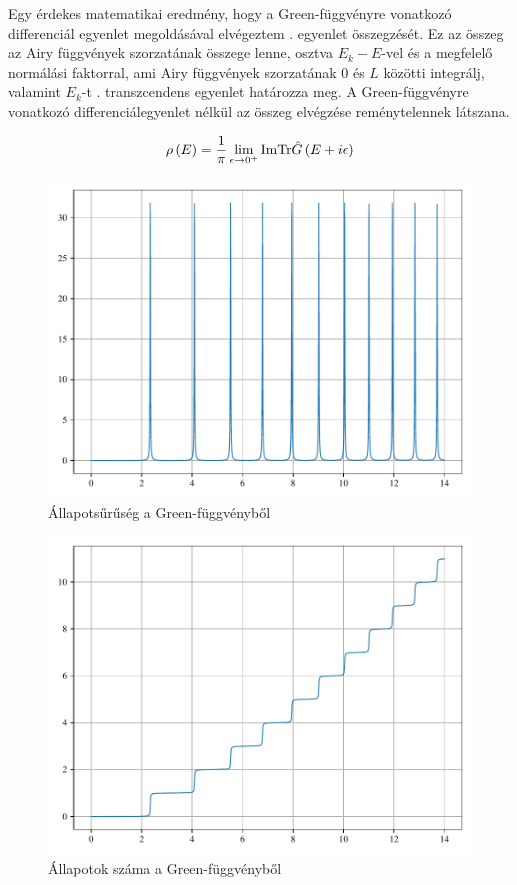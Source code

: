 Egy érdekes matematikai eredmény, hogy a Green-függvényre vonatkozó differenciál egyenlet megoldásával elvégeztem . egyenlet összegzését. Ez az összeg az Airy függvények szorzatának összege lenne, osztva $E_k-E$-vel és a megfelelő normálási faktorral, ami Airy függvények szorzatának $0$ és $L$ közötti integrálj, valamint $E_k$-t . transzcendens egyenlet határozza meg. A Green-függvényre vonatkozó differenciálegyenlet nélkül az összeg elvégzése reménytelennek látszana.

\begin{equation}
	\rho\left(E\right) = \frac{1}{\pi}\lim_{\epsilon \to 0^+} \mathrm{Im}\mathrm{Tr}\hat{G}\left(E + i\epsilon\right)
\end{equation}
\begin{figure}[H]
	\includegraphics[scale=1]{./figs/dosfromgreen.pdf}
	\caption{Állapotsűrűség a Green-függvényből}
\end{figure}
\begin{figure}[H]
	\includegraphics[scale=1]{./figs/numberofstatesfromgreen.pdf}
	\caption{Állapotok száma a Green-függvényből}
\end{figure}

